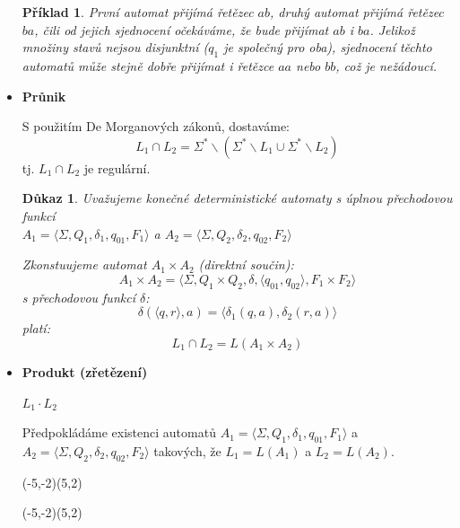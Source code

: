 \documentclass[10pt, a4paper, titlepage]{article}
\theoremstyle{note}
\newtheorem{dukaz}{\textbf{Důkaz}}
\newtheorem{priklad}{\textbf{Příklad}}
\newcommand{\aut}[1]{$A_#1= \langle \Sigma,Q_#1,\delta_#1,q_{0#1},F_#1 \rangle$}
\begin{document}
\begin{itemize}
\begin{priklad}
První automat přijímá řetězec $ab$, druhý automat přijímá řetězec $ba$, čili od jejich sjednocení očekáváme, že bude přijímat $ab$ i $ba$. Jelikož množiny stavů nejsou disjunktní ($q_1$ je společný pro oba), sjednocení těchto automatů může stejně dobře přijímat i řetězce $aa$ nebo $bb$, což je nežádoucí.
\end{priklad}

\item
\textbf{Průnik} 

S použitím De Morganových zákonů, dostaváme:
$$L_1 \cap L_2 = \Sigma^* \backslash (\Sigma^* \backslash L_1 \cup \Sigma^* \backslash L_2 )$$
tj. $L_1 \cap L_2$ je regulární.

\begin{dukaz}
Uvažujeme konečné deterministické automaty s úplnou přechodovou funkcí\\
\aut{1} a \aut{2}

Zkonstuujeme automat $A_1 \times A_2$ (direktní součin):
$$A_1 \times A_2 = \langle \Sigma,Q_1 \times Q_2,\delta, \langle q_{01},q_{02} \rangle,F_1 \times F_2 \rangle$$
s přechodovou funkcí $\delta$:
$$ \delta (\langle q,r \rangle , a) = \langle \delta_1 (q,a), \delta_2 (r,a) \rangle $$
platí:
$$L_1 \cap L_2 = L(A_1 \times A_2)$$
\end{dukaz}

\item
\textbf{Produkt (zřetězení)} 

$L_1 \cdot L_2$

Předpokládáme existenci automatů \aut{1} a \aut{2} takových, že $L_1 = L(A_1)$ a $L_2 = L(A_2) $.

\begin{center}
\begin{VCPicture}{(-5,-2)(5,2)}
\FixStateDiameter{3cm} 
\FixStateDiameter{0.3cm} 

\end{VCPicture}
\end{center}

\begin{center}
\begin{VCPicture}{(-5,-2)(5,2)}
\FixStateDiameter{3cm} 
\FixStateDiameter{0.3cm} 


\end{VCPicture}
\end{center}
\end{itemize}
\end{document}
